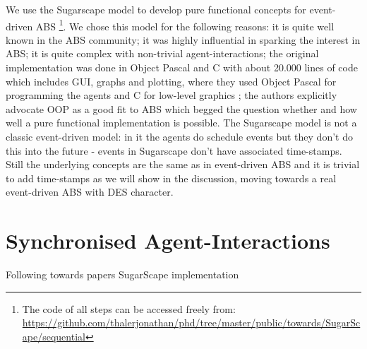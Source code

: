 We use the Sugarscape model to develop pure functional concepts for event-driven ABS \footnote{The code of all steps can be accessed freely from: \url{https://github.com/thalerjonathan/phd/tree/master/public/towards/SugarScape/sequential}}. We chose this model for the following reasons: it is quite well known in the ABS community; it was highly influential in sparking the interest in ABS; it is quite complex with non-trivial agent-interactions; the original implementation was done in Object Pascal and C with about 20.000 lines of code which includes GUI, graphs and plotting, where they used Object Pascal for programming the agents and C for low-level graphics \cite{axtell_aligning_1996}; the authors explicitly advocate OOP as a good fit to ABS which begged the question whether and how well a pure functional implementation is possible. The Sugarscape model is not a classic event-driven model: in it the agents do schedule events but they don't do this into the future - events in Sugarscape don't have associated time-stamps. Still the underlying concepts are the same as in event-driven ABS and it is trivial to add time-stamps as we will show in the discussion, moving towards a real event-driven ABS with DES character.





\section{Synchronised Agent-Interactions}
Following towards papers SugarScape implementation



